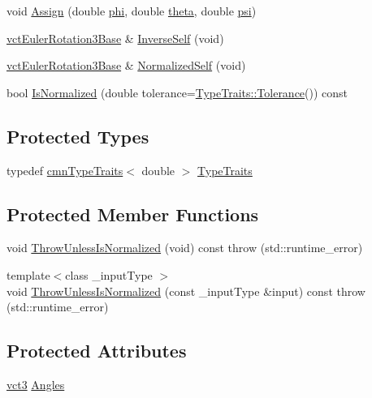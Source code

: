 \begin{DoxyCompactItemize}
void \hyperlink{classvct_euler_rotation3_base_a94233aef8bc9e0a56bd55e4e23009c62}{Assign} (double \hyperlink{classvct_euler_rotation3_base_af2e807e479e504cd47c58b308f25317c}{phi}, double \hyperlink{classvct_euler_rotation3_base_ac74e14d30f7d2077068e2f4b5c7219b1}{theta}, double \hyperlink{classvct_euler_rotation3_base_aeee06e33924728dd210644a390f86522}{psi})
\item 
\hyperlink{classvct_euler_rotation3_base}{vct\-Euler\-Rotation3\-Base} \& \hyperlink{classvct_euler_rotation3_base_a1a3771e279d6d79e51685695f266a9b4}{Inverse\-Self} (void)
\item 
\hyperlink{classvct_euler_rotation3_base}{vct\-Euler\-Rotation3\-Base} \& \hyperlink{classvct_euler_rotation3_base_af30b80b49e77f880948f236c58b45387}{Normalized\-Self} (void)
\item 
bool \hyperlink{classvct_euler_rotation3_base_a45a2bd9c871bcd6414b0a0ef84bae4bd}{Is\-Normalized} (double tolerance=\hyperlink{classcmn_type_traits_adc129bf9867295b90d300768b780fa99}{Type\-Traits\-::\-Tolerance}()) const 
\end{DoxyCompactItemize}
\subsection*{Protected Types}
\begin{DoxyCompactItemize}
\item 
typedef \hyperlink{classcmn_type_traits}{cmn\-Type\-Traits}$<$ double $>$ \hyperlink{classvct_euler_rotation3_base_afa97e7870204c6ff1872a0e46e45de39}{Type\-Traits}
\end{DoxyCompactItemize}
\subsection*{Protected Member Functions}
\begin{DoxyCompactItemize}
\item 
void \hyperlink{classvct_euler_rotation3_base_a593489f9bbc621319fd7d7fd3cdc3b97}{Throw\-Unless\-Is\-Normalized} (void) const   throw (std\-::runtime\-\_\-error)
\item 
{\footnotesize template$<$class \-\_\-input\-Type $>$ }\\void \hyperlink{classvct_euler_rotation3_base_ad0b0fa34d868d1031e444a2e35aa928e}{Throw\-Unless\-Is\-Normalized} (const \-\_\-input\-Type \&input) const   throw (std\-::runtime\-\_\-error)
\end{DoxyCompactItemize}
\subsection*{Protected Attributes}
\begin{DoxyCompactItemize}
\item 
\hyperlink{vct_fixed_size_vector_types_8h_a3af82acdbf4eeb73c551909240b106ea}{vct3} \hyperlink{classvct_euler_rotation3_base_a203faf33e57587d98e65a216d186288c}{Angles}
\end{DoxyCompactItemize}


